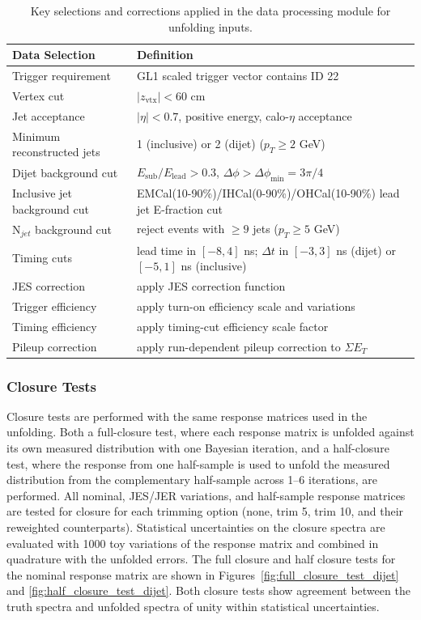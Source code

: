 \begin{table}[t]
    \centering
    \small
    \begin{tabular}{ll}
        \hline
        Data Selection & Definition \\
        \hline
        Trigger requirement & GL1 scaled trigger vector contains ID 22 \\
        Vertex cut & $|z_{\mathrm{vtx}}|<60$ cm \\
        Jet acceptance & $|\eta|<0.7$, positive energy, calo-$\eta$ acceptance \\
        Minimum reconstructed jets & 1 (inclusive) or 2 (dijet) ($p_{T}\ge 2$ GeV) \\
        Dijet background cut & $E_{\mathrm{sub}}/E_{\mathrm{lead}}>0.3$, $\Delta\phi>\Delta\phi_{\mathrm{min}} = 3\pi / 4$ \\
        Inclusive jet background cut & EMCal(10-90\%)/IHCal(0-90\%)/OHCal(10-90\%) lead jet E-fraction cut \\
        N$_{jet}$ background cut & reject events with $\ge 9$ jets ($p_{T}\ge 5$ GeV) \\
        Timing cuts & lead time in $[-8,4]$ ns; $\Delta t$ in $[-3,3]$ ns (dijet) or $[-5,1]$ ns (inclusive) \\
        JES correction & apply JES correction function \\
        Trigger efficiency & apply turn-on efficiency scale and variations \\
        Timing efficiency & apply timing-cut efficiency scale factor \\
        Pileup correction & apply run-dependent pileup correction to $\Sigma E_{T}$ \\
        \hline
    \end{tabular}
    \caption{Key selections and corrections applied in the data processing module for unfolding inputs.}
    \label{tab:data_unfold_processing}
\end{table}

\subsubsection{Closure Tests}
Closure tests are performed with the same response matrices used in the unfolding. 
Both a full-closure test, where each response matrix is unfolded against its own measured distribution with one Bayesian iteration, and a half-closure test, where the response from one half-sample is used to unfold the measured distribution from the complementary half-sample across 1--6 iterations, are performed. 
All nominal, JES/JER variations, and half-sample response matrices are tested for closure for each trimming option (none, trim 5, trim 10, and their reweighted counterparts). 
Statistical uncertainties on the closure spectra are evaluated with 1000 toy variations of the response matrix and combined in quadrature with the unfolded errors. 
The full closure and half closure tests for the nominal response matrix are shown in Figures~\ref{fig:full_closure_test_dijet} and \ref{fig:half_closure_test_dijet}. Both closure tests show agreement between the truth spectra and unfolded spectra of unity within statistical uncertainties. 

